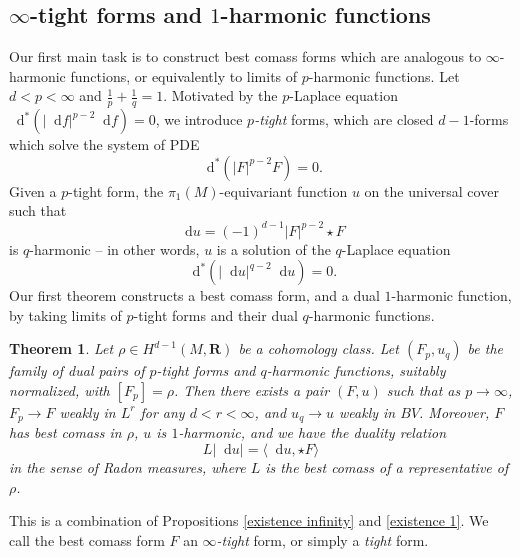 \documentclass[reqno,11pt]{amsart}
\newcommand{\RR}{\mathbf{R}}
\newcommand*\dif{\mathop{}\!\mathrm{d}}
\newcommand{\dfn}[1]{\emph{#1}\index{#1}}
\newtheorem{mainthm}{Theorem}
\theoremstyle{definition}
\numberwithin{equation}{section}
\begin{document}
\subsection{\texorpdfstring{$\infty$-tight forms and $1$-harmonic functions}{Infinity-tight forms and one-harmonic functions}}
Our first main task is to construct best comass forms which are analogous to $\infty$-harmonic functions, or equivalently to limits of $p$-harmonic functions.
Let $d < p < \infty$ and $\frac{1}{p} + \frac{1}{q} = 1$.
Motivated by the $p$-Laplace equation $\dif^*(|\dif f|^{p - 2} \dif f) = 0$, we introduce \dfn{$p$-tight} forms, which are closed $d-1$-forms which solve the system of PDE
$$\dif^*(|F|^{p - 2} F) = 0.$$
Given a $p$-tight form, the $\pi_1(M)$-equivariant function $u$ on the universal cover such that
$$\dif u = (-1)^{d - 1} |F|^{p - 2} \star F$$
is $q$-harmonic -- in other words, $u$ is a solution of the $q$-Laplace equation 
$$\dif^*(|\dif u|^{q - 2} \dif u) = 0.$$
Our first theorem constructs a best comass form, and a dual $1$-harmonic function, by taking limits of $p$-tight forms and their dual $q$-harmonic functions.

\begin{mainthm}\label{existence of infinity tight forms}
Let $\rho \in H^{d - 1}(M, \RR)$ be a cohomology class.
Let $(F_p, u_q)$ be the family of dual pairs of $p$-tight forms and $q$-harmonic functions, suitably normalized, with $[F_p] = \rho$.
Then there exists a pair $(F, u)$ such that as $p \to \infty$, $F_p \to F$ weakly in $L^r$ for any $d < r < \infty$, and $u_q \to u$ weakly in $BV$.
Moreover, $F$ has best comass in $\rho$, $u$ is $1$-harmonic, and we have the duality relation 
\begin{equation}\label{max flow mean cut}
L|\dif u| = \langle \dif u, \star F\rangle
\end{equation}
in the sense of Radon measures, where $L$ is the best comass of a representative of $\rho$.
\end{mainthm}

This is a combination of Propositions \ref{existence infinity} and \ref{existence 1}.
We call the best comass form $F$ an \dfn{$\infty$-tight} form, or simply a \dfn{tight} form.
\end{document}
